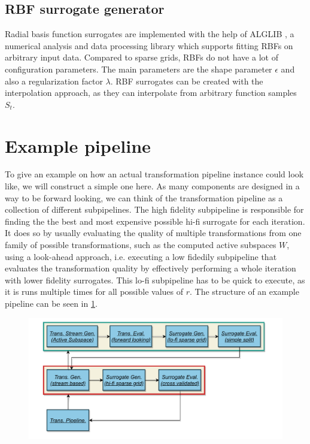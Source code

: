 \documentclass[
  a4paper,  %
  twoside,  %
  bibliography=totoc,
  headsepline,
  cleardoublepage=empty,
  parskip=half,
  draft=false
]{scrbook}
\begin{document}
\subsection {RBF surrogate generator}

Radial basis function surrogates are implemented with the help of ALGLIB \cite{}, a numerical analysis and data processing library which supports fitting RBFs on arbitrary input data.
Compared to sparse grids, RBFs do not have a lot of configuration parameters.
The main parameters are the shape parameter $\epsilon$ and also a regularization factor $\lambda$.
RBF surrogates can be created with the interpolation approach, as they can interpolate from arbitrary function samples $S_t$.

\section{Example pipeline}

To give an example on how an actual transformation pipeline instance could look like, we will construct a simple one here.
As many components are designed in a way to be forward looking, we can think of the transformation pipeline as a collection of different subpipelines.
The high fidelity subpipeline is responsible for finding the the best and most expensive possible hi-fi surrogate for each iteration.
It does so by usually evaluating the quality of multiple transformations from one family of possible transformations, such as the computed active subspaces $W$, using a look-ahead approach, i.e. executing a low fidedily subpipeline that evaluates the transformation quality by effectively performing a whole iteration with lower fidelity surrogates.
This lo-fi subpipeline has to be quick to execute, as it is runs multiple times for all possible values of $r$.
The structure of an example pipeline can be seen in \cref{fig:tpex}.

\begin{mdframed}[style=style]
\begin{figure}[H]
\includegraphics[width=\textwidth]{graphics/PipelineExample.pdf}
\delimit

\label{fig:tpex}
\end{figure}
\end{mdframed}
\end{document}
